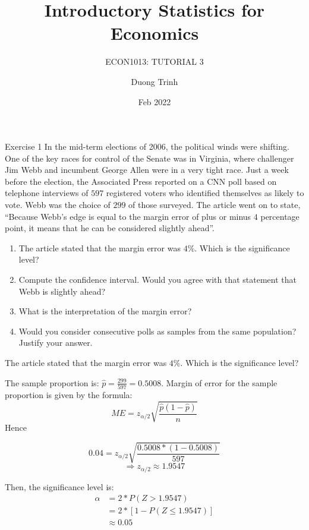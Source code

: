 \documentclass[
  10pt,
  ignorenonframetext,
]{beamer}
\title{Introductory Statistics for Economics}
\subtitle{ECON1013: TUTORIAL 3}
\author{Duong Trinh}
\date{Feb 2022}
\institute{University of Glasgow}
\begin{document}
\frame{\titlepage}

\begin{frame}{Exercise 1}
\protect\hypertarget{exercise-1}{}
In the mid-term elections of 2006, the political winds were shifting.
One of the key races for control of the Senate was in Virginia, where
challenger Jim Webb and incumbent George Allen were in a very tight
race. Just a week before the election, the Associated Press reported on
a CNN poll based on telephone interviews of \(597\) registered voters
who identified themselves as likely to vote. Webb was the choice of
\(299\) of those surveyed. The article went on to state, ``Because
Webb's edge is equal to the margin error of plus or minus \(4\)
percentage point, it means that he can be considered slightly ahead''.

\begin{enumerate}
  \item The article stated that the margin error was $4\%$. Which is the significance level?
  \item Compute the confidence interval. Would you agree with that statement that Webb is slightly ahead?
  \item What is the interpretation of the margin error?
  \item Would you consider consecutive polls as samples from the same population? Justify your answer.
\end{enumerate}
\end{frame}

\begin{frame}{The article stated that the margin error was \(4\%\).
Which is the significance level?}
\protect\hypertarget{the-article-stated-that-the-margin-error-was-4.-which-is-the-significance-level}{}
\pause

The sample proportion is: \(\hat{p} = \frac{299}{597} = 0.5008\). Margin
of error for the sample proportion is given by the formula: \[
ME = z_{\alpha/2}\sqrt{\frac{\hat{p}(1-\hat{p})}{n}}
\] Hence

\[
0.04 = z_{\alpha/2}\sqrt{\frac{0.5008*(1-0.5008)}{597}}
\] \[
\Rightarrow z_{\alpha/2} \approx 1.9547
\]

Then, the significance level is: \begin{align*}
\alpha &= 2*P(Z>1.9547)\\ 
       &= 2*[1-P(Z\leq1.9547)]\\
       &\approx 0.05
\end{align*}
\end{frame}
\end{document}
